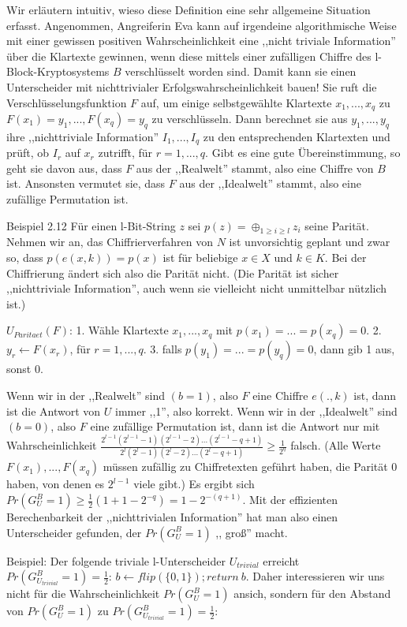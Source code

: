 \documentclass[a4paper]{article}
\begin{document}
\begin{multicols}{3}
    Wir erläutern intuitiv, wieso diese Definition eine sehr allgemeine Situation erfasst. Angenommen, Angreiferin Eva kann auf irgendeine algorithmische Weise mit einer gewissen positiven Wahrscheinlichkeit eine ,,nicht triviale Information'' über die Klartexte gewinnen, wenn diese mittels einer zufälligen Chiffre des l-Block-Kryptosystems $B$ verschlüsselt worden sind. Damit kann sie einen Unterscheider mit nichttrivialer Erfolgswahrscheinlichkeit bauen! Sie ruft die Verschlüsselungsfunktion $F$ auf, um einige selbstgewählte Klartexte $x_1,...,x_q$ zu $F(x_1)=y_1,...,F(x_q)=y_q$ zu verschlüsseln. Dann berechnet sie aus $y_1,...,y_q$ ihre ,,nichttriviale Information'' $I_1,...,I_q$ zu den entsprechenden Klartexten und prüft, ob $I_r$ auf $x_r$ zutrifft, für $r=1,...,q$. Gibt es eine gute Übereinstimmung, so geht sie davon aus, dass $F$ aus der ,,Realwelt'' stammt, also eine Chiffre von $B$ ist. Ansonsten vermutet sie, dass $F$ aus der ,,Idealwelt'' stammt, also eine zufällige Permutation ist.

    Beispiel 2.12 Für einen l-Bit-String $z$ sei $p(z)=\oplus_{1 \geq i\geq l} z_i$ seine Parität. Nehmen wir an, das Chiffrierverfahren von $N$ ist unvorsichtig geplant und zwar so, dass $p(e(x,k)) =p(x)$ ist für beliebige $x\in X$ und $k\in K$. Bei der Chiffrierung ändert sich also die Parität nicht. (Die Parität ist sicher ,,nichttriviale Information'', auch wenn sie vielleicht nicht unmittelbar nützlich ist.)

    $U_{Paritaet}(F)$:
    1. Wähle Klartexte $x_1,...,x_q$ mit $p(x_1)=...=p(x_q) = 0$.
    2. $y_r\leftarrow F(x_r)$, für $r=1,...,q$.
    3. falls $p(y_1)=...=p(y_q)=0$, dann gib 1 aus, sonst 0.

    Wenn wir in der  ,,Realwelt''  sind $(b=1)$, also $F$ eine Chiffre $e(.,k)$ ist, dann ist die Antwort von $U$ immer ,,1'', also korrekt. Wenn wir in der ,,Idealwelt'' sind $(b=0)$, also $F$ eine zufällige Permutation ist, dann ist die Antwort nur mit Wahrscheinlichkeit $\frac{2^{l-1} (2^{l-1} -1)(2^{l-1}-2)...(2^{l-1} -q+ 1)}{2^l (2^l-1)(2^l-2)...(2^l-q+ 1)} \geq \frac{1}{2^q}$ falsch. (Alle Werte $F(x_1),...,F(x_q)$ müssen zufällig zu Chiffretexten geführt haben, die Parität 0 haben, von denen es $2^{l-1}$ viele gibt.) Es ergibt sich $Pr(G^B_U= 1)\geq\frac{1}{2} (1+1-2^{-q}) =1-2^{-(q+1)}$. Mit der effizienten Berechenbarkeit der ,,nichttrivialen Information'' hat man also einen Unterscheider gefunden, der $Pr(G^B_U=1)$ ,, groß'' macht.

    Beispiel: Der folgende triviale l-Unterscheider $U_{trivial}$ erreicht $Pr(G^B_{U_{trivial}}= 1)=\frac{1}{2}$: $b\leftarrow flip(\{0,1\}); return\ b$.
    Daher interessieren wir uns nicht für die Wahrscheinlichkeit $Pr(G^B_U= 1)$ ansich, sondern für den Abstand von $Pr(G^B_U=1)$ zu $Pr(G^B_{U_{trivial}}= 1) =\frac{1}{2}$:


\end{multicols}
\end{document}
